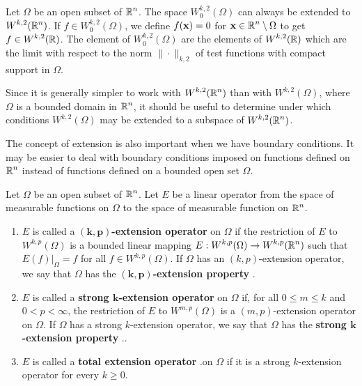 Let $\Omega$ be an open subset of $\displaystyle \mathbb{R}^n$.  The space
$\displaystyle W_0^{k,2}(\Omega)$ can always be extended to
$\displaystyle W^{k,2}(\mathbb{R}^n)$.  If 
$\displaystyle f\in W_0^{k,2}(\Omega)$, we define $f(\mathbf{x}) =0$ for
$\displaystyle \mathbf{x} \in \mathbb{R}^n\setminus \Omega$ to get
 $\displaystyle f \in W^{k,2}(\mathbb{R})$.
The element of $\displaystyle W_0^{k,2}(\Omega)$ are the elements of
$\displaystyle W^{k,2}(\mathbb{R})$
which are the limit with respect to the norm $\|\cdot\|_{k,2}$ of test
functions with compact support in $\Omega$.

Since it is generally simpler to work with $\displaystyle W^{k,2}(\mathbb{R}^n)$
than with $\displaystyle W^{k,2}(\Omega)$, where $\Omega$ is a bounded
domain in $\displaystyle \mathbb{R}^n$, it should be useful to determine under which
conditions $\displaystyle W^{k,2}(\Omega)$ 
may be extended to a subspace of $\displaystyle W^{k,2}(\mathbb{R}^n)$.

The concept of extension is also important when we have boundary
conditions.  It may be easier to deal with boundary conditions imposed on
functions defined on $\displaystyle \mathbb{R}^n$ instead of functions
defined on a bounded open set $\Omega$.

\begin{defn} \label{sob_k_ext_prop}
Let $\Omega$ be an open subset of $\displaystyle \mathbb{R}^n$.  Let $E$ be a linear
operator from the space of measurable functions on $\Omega$ to the
space of measurable function on $\displaystyle \mathbb{R}^n$.
\begin{enumerate}
\item $E$ is called a
{\bfseries $\mathbf{(k,p)}$-extension operator}%
on $\Omega$ if the restriction of $E$ to $\displaystyle W^{k,p}(\Omega)$
is a bounded linear mapping
$\displaystyle E:W^{k,p}(\Omega) \rightarrow W^{k,p}(\mathbb{R}^n)$ such that
$\displaystyle E(f)\big|_{\Omega} = f$ for all
$\displaystyle f\in W^{k,p}(\Omega)$.
If $\Omega$ has an $(k,p)$-extension operator, we say that $\Omega$ 
has the {\bfseries $\mathbf{(k,p)}$-extension property}%
.
\item $E$ is called a {\bfseries strong $\mathbf{k}$-extension operator}%
on $\Omega$ if, for all $0\leq m\leq k$ and $0 < p < \infty$, the
restriction of $E$ to $\displaystyle W^{m,p}(\Omega)$ is a
$(m,p)$-extension operator on $\Omega$.
If $\Omega$ has a strong $k$-extension operator, we say that $\Omega$ 
has the {\bfseries strong $\mathbf{k}$-extension property}%
..
\item $E$ is called a {\bfseries total extension operator}%
.on $\Omega$
if it is a strong $k$-extension operator for every $k \geq 0$.
\end{enumerate}
\end{defn}

